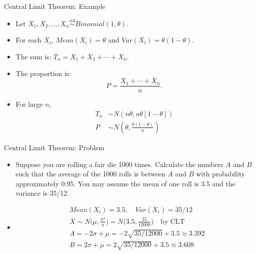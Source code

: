 \documentclass[10pt, xcolor=table]{beamer}
\begin{document}
\begin{frame}{Central Limit Theorem: Example}
\begin{itemize}
\setlength{\itemsep}{15pt}
\item<1-> Let $X_1, X_2,\dots, X_n \stackrel{iid}{\sim} Binomial(1, \theta)$.
\item<2-> For each $X_i$, $Mean(X_i) = \theta$ and $Var(X_i) = \theta(1-\theta).$
\item<3-> The sum is: $T_n = X_1 + X_2 + \cdots + X_n$.
\item<4-> The proportion is:
 $$P = \frac{X_1 + \cdots + X_n}{n}.$$
\item<6-> For large $n$, 
\begin{align*}
T_n &\sim N\left(n\theta, n\theta[1-\theta]\right) \\[1.5 em]
P &\sim N\left( \theta, \frac{\theta(1-\theta)}{n}\right)
\end{align*}
\end{itemize}
\end{frame}

\begin{frame}{Central Limit Theorem: Problem}
\begin{itemize}
\item<1-> Suppose you are rolling a fair die 1000 times. Calculate the numbers $A$ and $B$ such that the average of the 1000 rolls is between $A$ and $B$ with probability approximately 0.95. You may assume the mean of one roll is 3.5 and the variance is 35/12.
\item<2->[] {\color{red}
\vspace*{-0.5cm}
\begin{align*}
&Mean(X_i) = 3.5, \quad Var(X_i) = 35/12 \\
&\overline{X} \sim N\bigg(\mu, \frac{\sigma^2}{n}\bigg) = N\bigg(3.5, \frac{35}{12000} \bigg) \quad \text{by CLT}\\
&A = -2\sigma + \mu = -2\sqrt{35/12000} + 3.5 \approx 3.392 \\
&B = 2\sigma + \mu = 2\sqrt{35/12000} + 3.5 \approx 3.608
\end{align*}}
\vspace*{-0.25cm}
\end{itemize}
\end{frame}
\end{document}
